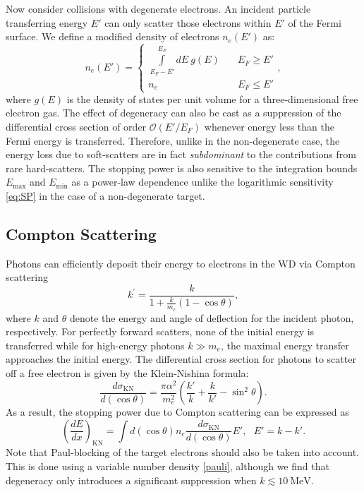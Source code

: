 \documentclass[twocolumn,showpacs,preprintnumbers,amsmath,amssymb,prd]{revtex4}
\def\r{\right)}
\def\l{\left(}
\begin{document}
\begin{appendices}
Now consider collisions with degenerate electrons.
An incident particle transferring energy $E'$ can only scatter those electrons within $E'$ of the Fermi surface.
We define a modified density of electrons $n_e(E')$ as:
\begin{equation}
\label{pauli}
n_e(E') = \left\{
        \begin{array}{ll}
            \displaystyle \int \limits_{E_F -E'}^{E_F}dE ~g(E) & \quad E_F \geq E' \\
            n_e & \quad E_F \leq E'
        \end{array}
    \right.,
\end{equation}
where $g(E)$ is the density of states per unit volume for a three-dimensional free electron gas.
The effect of degeneracy can also be cast as a suppression of the differential cross section of order $\mathcal{O}(E'/E_F)$ whenever energy less than the Fermi energy is transferred.
Therefore, unlike in the non-degenerate case, the energy loss due to soft-scatters are in fact \emph{subdominant} to the contributions from rare hard-scatters.
The stopping power is also sensitive to the integration bounds $E_{\text{max}}$ and $E_{\text{min}}$ as a power-law dependence unlike the logarithmic sensitivity \eqref{eq:SP} in the case of a non-degenerate target.

\subsection*{Compton Scattering}
Photons can efficiently deposit their energy to electrons in the WD via Compton scattering
\begin{equation}
{k^{\prime }={\frac {k}{1+{\frac {k}{m_e}}(1-\cos \theta )}}},
\end{equation}
where $k$ and $\theta$ denote the energy and angle of deflection for the incident photon, respectively.
For perfectly forward scatters, none of the initial energy is transferred while for high-energy photons $k \gg m_e$, the maximal energy transfer approaches the initial energy.
The differential cross section for photons to scatter off a free electron is given by the Klein-Nishina formula:
\begin{equation}
\label{KN}
\frac{d\sigma_\text{KN}}{d (\cos \theta)}=\frac{\pi \alpha^2}{m_e^2} \l \frac{k'}{k} + \frac{k}{k'} -\sin^2 \theta \r.
\end{equation}
As a result, the stopping power due to Compton scattering can be expressed as
\begin{equation}
\label{eq:comptonSP}
\l \frac{dE}{dx}\r_\text{KN} =  \int d (\cos \theta) n_e \frac{d\sigma_\text{KN}}{d (\cos \theta)} E', ~~~ E' = k - k'.
\end{equation}
Note that Paul-blocking of the target electrons should also be taken into account.
This is done using a variable number density \eqref{pauli}, although we find that degeneracy only introduces a significant suppression when $k\lesssim 10 ~\text{MeV}$.


\end{appendices}
\end{document}
